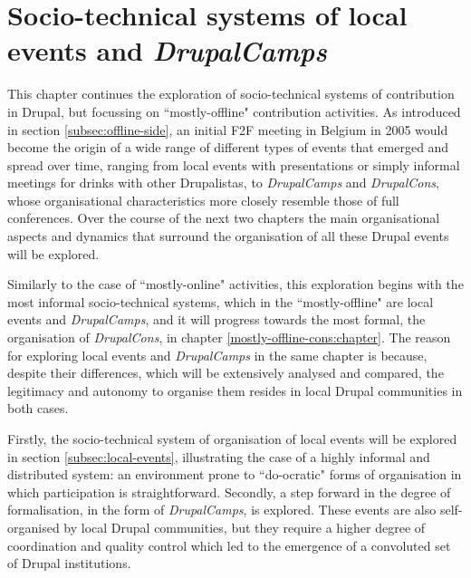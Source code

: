 \chapter{Socio-technical systems of local events and \textit{DrupalCamps}}
\label{mostly-offline-local:chapter}

This chapter continues the exploration of socio-technical systems of contribution in Drupal, but focussing on ``mostly-offline" contribution activities. As introduced in section \ref{subsec:offline-side}, an initial F2F meeting in Belgium in 2005 would become the origin of a wide range of different types of events that emerged and spread over time, ranging from local events with presentations or simply informal meetings for drinks with other Drupalistas, to \textit{DrupalCamps} and \textit{DrupalCons}, whose organisational characteristics more closely resemble those of full conferences. Over the course of the next two chapters the main organisational aspects and dynamics that surround the organisation of all these Drupal events will be explored.

Similarly to the case of ``mostly-online" activities, this exploration begins with the most informal socio-technical systems, which in the ``mostly-offline" are local events and \textit{DrupalCamps}, and it will progress towards the most formal, the organisation of \textit{DrupalCons}, in chapter \ref{mostly-offline-cons:chapter}. The reason for exploring local events and \textit{DrupalCamps} in the same chapter is because, despite their differences, which will be extensively analysed and compared, the legitimacy and autonomy to organise them resides in local Drupal communities in both cases.

Firstly, the socio-technical system of organisation of local events will be explored in section \ref{subsec:local-events}, illustrating the case of a highly informal and distributed system: an environment prone to ``do-ocratic" forms of organisation in which participation is straightforward. Secondly, a step forward in the degree of formalisation, in the form of \textit{DrupalCamps}, is explored. These events are also self-organised by local Drupal communities, but they require a higher degree of coordination and quality control which led to the emergence of a convoluted set of Drupal institutions.


